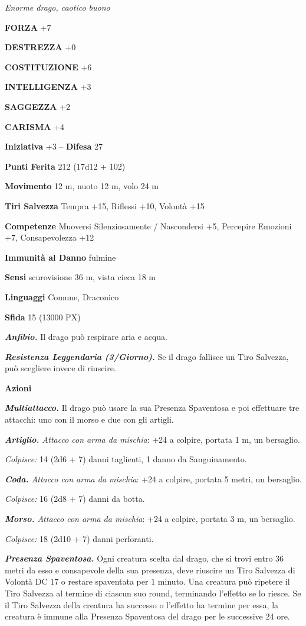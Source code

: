 \begin{multicols}{2}
\textit{Enorme drago, caotico buono}

\textbf{FORZA} +7

\textbf{DESTREZZA} +0

\textbf{COSTITUZIONE} +6

\textbf{INTELLIGENZA} +3

\textbf{SAGGEZZA} +2

\textbf{CARISMA} +4

\textbf{Iniziativa} +3 -- \textbf{Difesa} 27

\textbf{Punti Ferita} 212 (17d12 + 102)

\textbf{Movimento} 12 m, nuoto 12 m, volo 24 m

\textbf{Tiri Salvezza} Tempra +15, Riflessi +10, Volontà +15

\textbf{Competenze} Muoversi Silenziosamente / Nascondersi +5, Percepire Emozioni +7, Consapevolezza +12

\textbf{Immunità al Danno} fulmine

\textbf{Sensi} scurovisione 36 m, vista cieca 18 m

\textbf{Linguaggi} Comune, Draconico

\textbf{Sfida} 15 (13000 PX)

\textit{\textbf{Anfibio.}} Il drago può respirare aria e acqua.

\textit{\textbf{Resistenza Leggendaria (3/Giorno).}} Se il drago fallisce un Tiro Salvezza, può scegliere invece di riuscire.

\textbf{Azioni}

\textit{\textbf{Multiattacco.}} Il drago può usare la sua Presenza Spaventosa e poi effettuare tre attacchi: uno con il morso e due con gli artigli.

\textit{\textbf{Artiglio.} Attacco con arma da mischia}: +24 a colpire, portata 1 m, un bersaglio.

\textit{Colpisce:} 14 (2d6 + 7) danni taglienti, 1 danno da Sanguinamento.

\textit{\textbf{Coda.} Attacco con arma da mischia}: +24 a colpire, portata 5 metri, un bersaglio.

\textit{Colpisce:} 16 (2d8 + 7) danni da botta.

\textit{\textbf{Morso.} Attacco con arma da mischia}: +24 a colpire, portata 3 m, un bersaglio.

\textit{Colpisce:} 18 (2d10 + 7) danni perforanti.

\textit{\textbf{Presenza Spaventosa.}} Ogni creatura scelta dal drago, che si trovi entro 36 metri da esso e consapevole della sua presenza, deve riuscire un Tiro Salvezza di Volontà DC 17 o restare spaventata per 1 minuto. Una creatura può ripetere il Tiro Salvezza al termine di ciascun suo round, terminando l'effetto se lo riesce. Se il Tiro Salvezza della creatura ha successo o l'effetto ha termine per essa, la creatura è immune alla Presenza Spaventosa del drago per le successive 24 ore.


\end{multicols}
